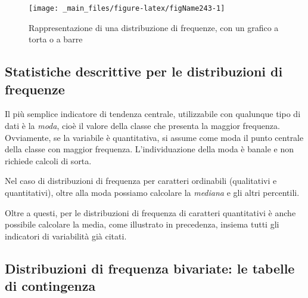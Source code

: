 \documentclass[a4paper,12pt,oneside]{book}
\newenvironment{Shaded}{}{}
\newcommand{\KeywordTok}[1]{#1}
\newcommand{\DataTypeTok}[1]{#1}
\newcommand{\DecValTok}[1]{#1}
\newcommand{\StringTok}[1]{#1}
\newcommand{\OperatorTok}[1]{#1}
\newcommand{\NormalTok}[1]{#1}
\begin{document}
\begin{Shaded}
\end{Shaded}

\begin{figure}

{\centering \texttt{[image: \_main\_files/figure-latex/figName243-1]} 

}

\caption{Rappresentazione di una distribuzione di frequenze, con un grafico a torta o a barre}\label{fig:figName243}
\end{figure}

\hypertarget{statistiche-descrittive-per-le-distribuzioni-di-frequenze}{%
\subsection*{Statistiche descrittive per le distribuzioni di frequenze}\label{statistiche-descrittive-per-le-distribuzioni-di-frequenze}}

Il più semplice indicatore di tendenza centrale, utilizzabile con qualunque tipo di dati è la \emph{moda}, cioè il valore della classe che presenta la maggior frequenza. Ovviamente, se la variabile è quantitativa, si assume come moda il punto centrale della classe con maggior frequenza. L'individuazione della moda è banale e non richiede calcoli di sorta.

Nel caso di distribuzioni di frequenza per caratteri ordinabili (qualitativi e quantitativi), oltre alla moda possiamo calcolare la \emph{mediana} e gli altri percentili.

Oltre a questi, per le distribuzioni di frequenza di caratteri quantitativi è anche possibile calcolare la media, come illustrato in precedenza, insiema tutti gli indicatori di variabilità già citati.

\hypertarget{distribuzioni-di-frequenza-bivariate-le-tabelle-di-contingenza}{%
\subsection*{Distribuzioni di frequenza bivariate: le tabelle di contingenza}\label{distribuzioni-di-frequenza-bivariate-le-tabelle-di-contingenza}}
\end{document}
